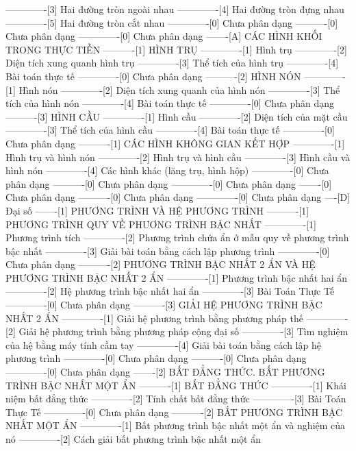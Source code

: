 -------------[3] Hai đường tròn ngoài nhau
-------------[4] Hai đường tròn đựng nhau
-------------[5] Hai đường tròn cắt nhau
-------------[0] Chưa phân dạng
----------[0] Chưa phân dạng
-------------[0] Chưa phân dạng
-------[A] CÁC HÌNH KHỐI TRONG THỰC TIỄN
----------[1] HÌNH TRỤ
-------------[1] Hình trụ
-------------[2] Diện tích xung quanh hình trụ
-------------[3] Thể tích của hình trụ
-------------[4] Bài toán thực tế
-------------[0] Chưa phân dạng
----------[2] HÌNH NÓN
-------------[1] Hình nón
-------------[2] Diện tích xung quanh của hình nón
-------------[3] Thể tích của hình nón
-------------[4] Bài toán thực tế
-------------[0] Chưa phân dạng
----------[3] HÌNH CẦU
-------------[1] Hình cầu
-------------[2] Diện tích của mặt cầu
-------------[3] Thể tích của hình cầu
-------------[4] Bài toán thực tế
-------------[0] Chưa phân dạng
----------[1] CÁC HÌNH KHÔNG GIAN KẾT HỢP
-------------[1] Hình trụ và hình nón
-------------[2] Hình trụ và hình cầu
-------------[3] Hình cầu và hình nón
-------------[4] Các hình khác (lăng trụ, hình hộp)
-------------[0] Chưa phân dạng
----------[0] Chưa phân dạng
-------------[0] Chưa phân dạng
-------[0] Chưa phân dạng
----------[0] Chưa phân dạng
-------------[0] Chưa phân dạng
----[D] Đại số
-------[1] PHƯƠNG TRÌNH VÀ HỆ PHƯƠNG TRÌNH
----------[1] PHƯƠNG TRÌNH QUY VỀ PHƯƠNG TRÌNH BẬC NHẤT
-------------[1] Phương trình tích
-------------[2] Phương trình chứa ẩn ở mẫu quy về phương trình bậc nhất
-------------[3] Giải bài toán bằng cách lập phương trình
-------------[0] Chưa phân dạng
----------[2] PHƯƠNG TRÌNH BẬC NHẤT 2 ẨN VÀ HỆ PHƯƠNG TRÌNH BẬC NHẤT 2 ẨN
-------------[1] Phương trình bậc nhất hai ẩn
-------------[2] Hệ phương trình bậc nhất hai ẩn
-------------[3] Bài Toán Thực Tế
-------------[0] Chưa phân dạng
----------[3] GIẢI HỆ PHƯƠNG TRÌNH BẬC NHẤT 2 ẨN
-------------[1] Giải hệ phương trình bằng phương pháp thế
-------------[2] Giải hệ phương trình bằng phương pháp cộng đại số
-------------[3] Tìm nghiệm của hệ bằng máy tính cầm tay
-------------[4] Giải bài toán bằng cách lập hệ phương trình
-------------[0] Chưa phân dạng
----------[0] Chưa phân dạng
-------------[0] Chưa phân dạng
-------[2] BẤT ĐẲNG THỨC. BẤT PHƯƠNG TRÌNH BẬC NHẤT MỘT ẨN
----------[1] BẤT ĐẲNG THỨC
-------------[1] Khái niệm bất đẳng thức
-------------[2] Tính chất bất đẳng thức
-------------[3] Bài Toán Thực Tế
-------------[0] Chưa phân dạng
----------[2] BẤT PHƯƠNG TRÌNH BẬC NHẤT MỘT ẨN
-------------[1] Bất phương trình bậc nhất một ẩn và nghiệm của nó
-------------[2] Cách giải bất phương trình bậc nhất một ẩn
